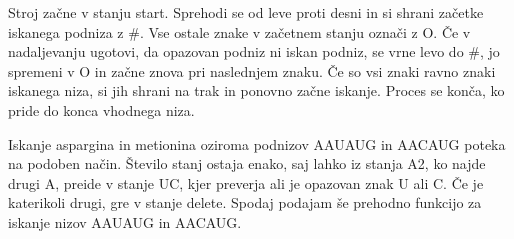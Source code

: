\documentclass{article}
\begin{document}
% 

Stroj začne v stanju {\selectfont start}. Sprehodi se od leve proti desni in si shrani začetke iskanega podniza z {\selectfont \#}. Vse ostale znake v začetnem stanju označi z {\selectfont O}.
Če v nadaljevanju ugotovi, da opazovan podniz ni iskan podniz, se vrne levo do {\selectfont \#}, jo spremeni v {\selectfont O} in začne znova pri naslednjem znaku.
Če so vsi znaki ravno znaki iskanega niza, si jih shrani na trak in ponovno začne iskanje. 
Proces se konča, ko pride do konca vhodnega niza. 

Iskanje aspargina in metionina oziroma podnizov {\selectfont AAUAUG} in {\selectfont AACAUG}
poteka na podoben način. Število stanj ostaja enako, saj lahko iz stanja {\selectfont A2}, ko najde drugi {\selectfont A}, preide v stanje {\selectfont UC}, kjer preverja ali je opazovan znak {\selectfont U} ali {\selectfont C}. 
Če je katerikoli drugi, gre v stanje {\selectfont delete}. Spodaj podajam še prehodno funkcijo za iskanje nizov {\selectfont AAUAUG} in {\selectfont AACAUG}.
\end{document}
